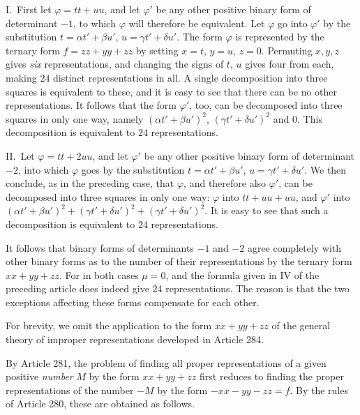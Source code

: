 I.\ First let $\varphi=tt+uu$, and let $\varphi'$ be any other positive binary
form of determinant $-1$, to which $\varphi$ will therefore be
equivalent. Let $\varphi$ go into $\varphi'$ by the substitution $t=\alpha t'+\beta u'$,
$u=\gamma t'+\delta u'$. The form $\varphi$ is represented by the ternary form $f=zz+yy+zz$
by setting $x=t$, $y=u$, $z=0$. Permuting $x,y,z$ gives
\textit{six} representations, and changing the signs of $t$,
$u$ gives four from each, making $24$ distinct representations
in all. A single decomposition into three squares is equivalent to
these, and it is easy to see that there can be no other representations.
It follows that the form $\varphi'$, too, can be decomposed into three
squares in only one way, namely $(\alpha t'+\beta u')^2$, $(\gamma t'+\delta u')^2$ and $0$.
This decomposition is equivalent to $24$ representations.

II.\ Let $\varphi=tt+2uu$, and let $\varphi'$ be any other positive binary
form of determinant $-2$, into which $\varphi$ goes by the substitution
$t=\alpha t'+\beta u'$, $u=\gamma t'+\delta u'$. We then conclude, as in the preceding case, that
$\varphi$, and therefore also $\varphi'$, can be decomposed into three
squares in only one way: $\varphi$ into $tt+uu+uu$, and $\varphi'$ into
$(\alpha t'+\beta u')^2+(\gamma t'+\delta u')^2+(\gamma t'+\delta u')^2$. It is easy to see that such a decomposition is equivalent
to $24$ representations.

It follows that binary forms of determinants $-1$ and $-2$
agree completely with other binary forms as to the number of their
representations by the ternary form $xx+yy+zz$. For in both cases
$\mu=0$, and the formula given in IV of the preceding article does
indeed give $24$ representations. The reason is that the two
exceptions affecting these forms compensate for each other.

For brevity, we omit the application to the form $xx+yy+zz$ of the general
theory of improper representations developed in Article 284.

By Article 281, the problem of finding all proper representations of
a given positive \textit{number} $M$ by the form $xx+yy+zz$ first
reduces to finding the proper representations of the number $-M$
by the form $-xx-yy-zz=f$. By the rules of Article 280, these are obtained
as follows.

